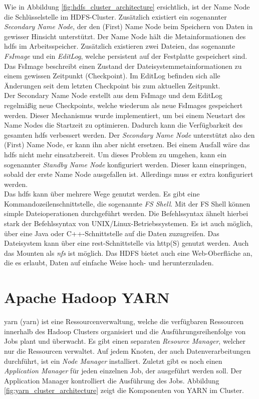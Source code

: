\noindent
Wie in Abbildung \ref{fig:hdfs_cluster_architecture} ersichtlich, ist der Name Node die Schlüsselstelle im HDFS-Cluster. Zusätzlich existiert ein sogenannter \textit{Secondary Name Node}, der den (First) Name Node beim Speichern von Daten in gewisser Hinsicht unterstützt. Der Name Node hält die Metainformationen des \gls{hdfs} im Arbeitsspeicher. Zusätzlich existieren zwei Dateien, das sogenannte \textit{FsImage} und ein \textit{EditLog}, welche persistent auf der Festplatte gespeichert sind. Das FsImage beschreibt einen Zustand der Dateisystemmetainformationen zu einem gewissen Zeitpunkt (Checkpoint). Im EditLog befinden sich alle Änderungen seit dem letzten Checkpoint bis zum aktuellen Zeitpunkt.\\
Der Secondary Name Node erstellt aus dem FsImage und dem EditLog regelmäßig neue Checkpoints, welche wiederum als neue FsImages gespeichert werden.
Dieser Mechanismus wurde implementiert, um bei einem Neustart des Name Nodes die Startzeit zu optimieren. Dadurch kann die Verfügbarkeit des gesamten \gls{hdfs}  verbessert werden. Der \textit{Secondary Name Node} unterstützt also den (First) Name Node, er kann ihn aber nicht ersetzen. Bei einem Ausfall wäre das \gls{hdfs} nicht mehr einsatzbereit. Um dieses Problem zu umgehen, kann ein sogenannter \textit{Standby Name Node} konfiguriert werden. Dieser kann einspringen, sobald der erste Name Node ausgefallen ist. Allerdings muss er extra konfiguriert werden.\cite[S. 40 ff.]{expert_hadoop_admin}\\

\noindent
Das \gls{hdfs} kann über mehrere Wege genutzt werden. Es gibt eine Kommandozeilenschnittstelle, die sogenannte \textit{FS Shell}. Mit der FS Shell können simple Dateioperationen durchgeführt werden. Die Befehlssyntax ähnelt hierbei stark der Befehlssyntax von UNIX/Linux-Betriebssystemen. Es ist auch möglich, über eine Java oder C++-Schnittstelle auf die Daten zuzugreifen. Das Dateisystem kann über eine \gls{rest}-Schnittstelle via \gls{http}(S) genutzt werden. Auch das Mounten als \textit{\gls{nfs}} ist möglich. Das HDFS bietet auch eine Web-Oberfläche an, die es erlaubt, Daten auf einfache Weise hoch- und herunterzuladen.

\section{Apache Hadoop YARN}
\label{sec:theory_yarn}
\acrshort{yarn} (\acrlong{yarn}) ist eine Ressourcenverwaltung, welche die verfügbaren Ressourcen innerhalb des Hadoop Clusters organisiert und die Ausführungsreihenfolge von Jobs plant und überwacht. Es gibt einen separaten \textit{Resource Manager}, welcher nur die Ressourcen verwaltet. Auf jedem Knoten, der auch Datenverarbeitungen durchführt, ist ein \textit{Node Manager} installiert. Zuletzt gibt es noch einen \textit{Application Manager} für jeden einzelnen Job, der ausgeführt werden soll. Der Application Manager kontrolliert die Ausführung des Jobs.
Abbildung \ref{fig:yarn_cluster_architecture} zeigt die Komponenten von YARN im Cluster.\\

